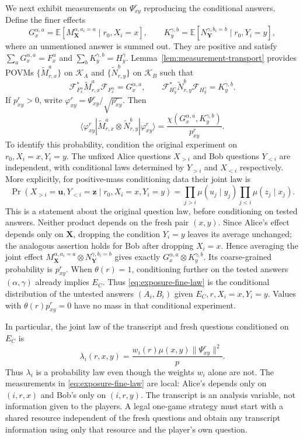 We next exhibit measurements on $\Psi_{xy}^r$ reproducing the
conditional answers. Define the finer effects
\[
 G_x^{\alpha,a}
  =\mathbb E[M_{\mathbf X}^{\alpha,a_i=a}\mid r_0,X_i=x],\qquad
 K_y^{\gamma,b}
  =\mathbb E[N_{\mathbf Y}^{\gamma,b_i=b}\mid r_0,Y_i=y],
\]
where an unmentioned answer is summed out. They are positive and satisfy
$\sum_aG_x^{\alpha,a}=F_x^\alpha$ and
$\sum_bK_y^{\gamma,b}=H_y^\gamma$. Lemma~\ref{lem:measurement-transport}
provides POVMs $\{\widetilde M_{r,x}^a\}$ on $\mathcal K_A$ and
$\{\widetilde N_{r,y}^b\}$ on $\mathcal K_B$ such that
\[
 \mathcal F_{F_x^\alpha}^*\widetilde M_{r,x}^a
      \mathcal F_{F_x^\alpha}=G_x^{\alpha,a},\qquad
 \mathcal F_{H_y^\gamma}^*\widetilde N_{r,y}^b
      \mathcal F_{H_y^\gamma}=K_y^{\gamma,b}.
\]
If $p_{xy}^r>0$, write
$\varphi_{xy}^r=\Psi_{xy}^r/\sqrt{p_{xy}^r}$. Then
\begin{equation}\label{eq:exposure-fine-law}
 \langle\varphi_{xy}^r|
      \widetilde M_{r,x}^a\otimes\widetilde N_{r,y}^b
       |\varphi_{xy}^r\rangle
  =\frac{\chi(G_x^{\alpha,a},K_y^{\gamma,b})}{p_{xy}^r}.
\end{equation}
To identify this probability, condition the original experiment on
$r_0,X_i=x,Y_i=y$. The unfixed Alice questions $X_{>i}$ and Bob
questions $Y_{<i}$ are independent, with conditional laws determined
by $Y_{>i}$ and $X_{<i}$ respectively. More explicitly, for positive-mass
conditioning data their joint law is
\[
 \Pr(X_{>i}=\mathbf u,Y_{<i}=\mathbf z\mid r_0,X_i=x,Y_i=y)
 =\prod_{j>i}\mu(u_j\mid y_j)
  \prod_{j<i}\mu(z_j\mid x_j).
\]
This is a statement about the original question law, before conditioning
on tested answers. Neither product depends on the fresh pair $(x,y)$.
Since Alice's effect depends only on $\mathbf X$, dropping the condition
$Y_i=y$ leaves its average unchanged; the analogous assertion holds for
Bob after dropping $X_i=x$. Hence averaging the joint effect
$M_{\mathbf X}^{\alpha,a_i=a}\otimes
 N_{\mathbf Y}^{\gamma,b_i=b}$ gives exactly
$G_x^{\alpha,a}\otimes K_y^{\gamma,b}$. Its coarse-grained probability
is $p_{xy}^r$. When $\theta(r)=1$, conditioning further on the tested
answers $(\alpha,\gamma)$ already implies $E_C$. Thus
\eqref{eq:exposure-fine-law} is the conditional distribution of the
untested answers $(A_i,B_i)$ given $E_C,r,X_i=x,Y_i=y$. Values with
$\theta(r)p_{xy}^r=0$ have no mass in that conditional experiment.

In particular, the joint law of the transcript and fresh questions
conditioned on $E_C$ is
\begin{equation}\label{eq:exposure-law}
 \lambda_i(r,x,y)=\frac{w_i(r)\mu(x,y)\|\Psi_{xy}^r\|^2}{p}.
\end{equation}
Thus $\lambda_i$ is a probability law even though the weights $w_i$
alone are not. The measurements in \eqref{eq:exposure-fine-law} are
local: Alice's depends only on $(i,r,x)$ and Bob's only on $(i,r,y)$.
The transcript is an analysis variable, not information given to the
players. A legal one-game strategy must start with a shared resource
independent of the fresh questions and obtain any transcript information
using only that resource and the player's own question.

